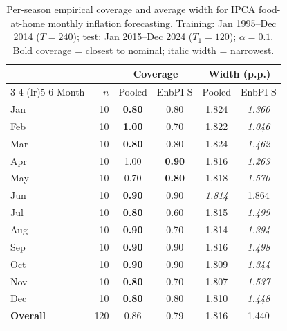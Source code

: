 \begin{table}[ht]
\centering
\caption{Per-season empirical coverage and average width for IPCA food-at-home monthly inflation forecasting.
Training: Jan 1995--Dec 2014 ($T=240$); test: Jan 2015--Dec 2024 ($T_1=120$); $\alpha=0.1$.
Bold coverage = closest to nominal; italic width = narrowest.}
\label{tab:empirical_food_coverage}
\begin{tabular}{l r cc cc}
\toprule
 & & \multicolumn{2}{c}{Coverage} & \multicolumn{2}{c}{Width (p.p.)} \\
\cmidrule(lr){3-4} \cmidrule(lr){5-6}
Month & $n$ & Pooled & EnbPI-S & Pooled & EnbPI-S \\
\midrule
Jan & 10 & \textbf{0.80} & 0.80 & 1.824 & \textit{1.360} \\
Feb & 10 & \textbf{1.00} & 0.70 & 1.822 & \textit{1.046} \\
Mar & 10 & \textbf{0.80} & 0.80 & 1.824 & \textit{1.462} \\
Apr & 10 & 1.00 & \textbf{0.90} & 1.816 & \textit{1.263} \\
May & 10 & 0.70 & \textbf{0.80} & 1.818 & \textit{1.570} \\
Jun & 10 & \textbf{0.90} & 0.90 & \textit{1.814} & 1.864 \\
Jul & 10 & \textbf{0.80} & 0.60 & 1.815 & \textit{1.499} \\
Aug & 10 & \textbf{0.90} & 0.70 & 1.814 & \textit{1.394} \\
Sep & 10 & \textbf{0.90} & 0.90 & 1.816 & \textit{1.498} \\
Oct & 10 & \textbf{0.90} & 0.90 & 1.809 & \textit{1.344} \\
Nov & 10 & \textbf{0.80} & 0.70 & 1.807 & \textit{1.537} \\
Dec & 10 & \textbf{0.80} & 0.80 & 1.810 & \textit{1.448} \\
\midrule
\textbf{Overall} & 120 & 0.86 & 0.79 & 1.816 & 1.440 \\
\bottomrule
\end{tabular}
\end{table}